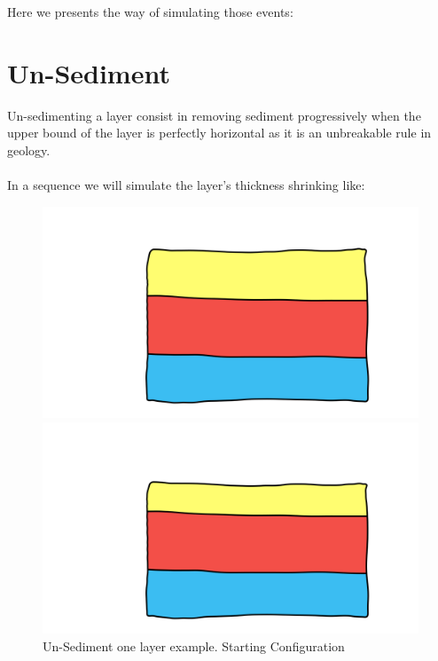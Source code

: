 \documentclass[12pt, a4paper]{report} %
\begin{document}
Here we presents the way of simulating those events:

\section{Un-Sediment}

Un-sedimenting a layer consist in removing sediment progressively when the upper bound of the layer is perfectly horizontal as it is an unbreakable rule in geology.\\\\

In a sequence we will simulate the layer's thickness shrinking like:
\begin{figure}[h]
    \begin{minipage}[c]{.50\linewidth}
        \centering
        \includegraphics[scale=0.2]{unSedimentDescription0.png}
	\caption{Un-Sediment one layer example. Starting Configuration}
    \end{minipage}
    \hfill%
    \begin{minipage}[c]{.50\linewidth}
        \centering
        \includegraphics[scale=0.2]{unSedimentDescription1.png}

\end{minipage}
\end{figure}
\end{document}
